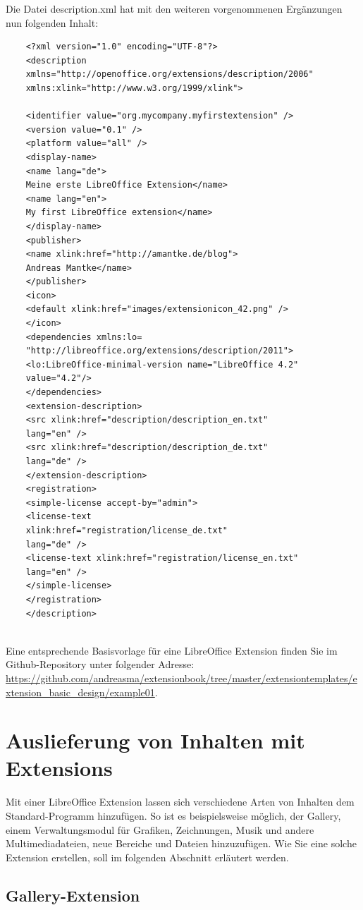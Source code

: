 \documentclass[12pt,a4paper,titlepage]{book}
\begin{document}
Die Datei description.xml hat mit den weiteren vorgenommenen Ergänzungen nun folgenden Inhalt:

\begin{lstlisting}
	<?xml version="1.0" encoding="UTF-8"?>
	<description
	xmlns="http://openoffice.org/extensions/description/2006"
	xmlns:xlink="http://www.w3.org/1999/xlink">
	
	<identifier value="org.mycompany.myfirstextension" />
	<version value="0.1" />
	<platform value="all" />
	<display-name>
	<name lang="de">
	Meine erste LibreOffice Extension</name>
	<name lang="en">
	My first LibreOffice extension</name>
	</display-name>
	<publisher>
	<name xlink:href="http://amantke.de/blog">
	Andreas Mantke</name>
	</publisher>
	<icon>
	<default xlink:href="images/extensionicon_42.png" />
	</icon>
	<dependencies xmlns:lo=
	"http://libreoffice.org/extensions/description/2011">
	<lo:LibreOffice-minimal-version name="LibreOffice 4.2" 
	value="4.2"/>
	</dependencies>
	<extension-description>
	<src xlink:href="description/description_en.txt" 
	lang="en" />
	<src xlink:href="description/description_de.txt" 
	lang="de" />
	</extension-description>
	<registration>
	<simple-license accept-by="admin">
	<license-text 
	xlink:href="registration/license_de.txt" 
	lang="de" />
	<license-text xlink:href="registration/license_en.txt" 
	lang="en" />
	</simple-license>
	</registration>
	</description>
	
\end{lstlisting}

Eine entsprechende Basisvorlage für eine LibreOffice Extension finden Sie im Github-Repository unter folgender Adresse:
\url{https://github.com/andreasma/extensionbook/tree/master/extensiontemplates/extension_basic_design/example01}.

\chapter{Auslieferung von Inhalten mit Extensions}

Mit einer LibreOffice Extension lassen sich verschiedene Arten von Inhalten dem Standard-Programm hinzufügen. So ist es beispielsweise möglich, der Gallery, einem Verwaltungsmodul für Grafiken, Zeichnungen, Musik und andere Multimediadateien, neue Bereiche und Dateien hinzuzufügen. Wie Sie eine solche Extension erstellen, soll im folgenden Abschnitt erläutert werden.

\section{Gallery-Extension}
\end{document}
